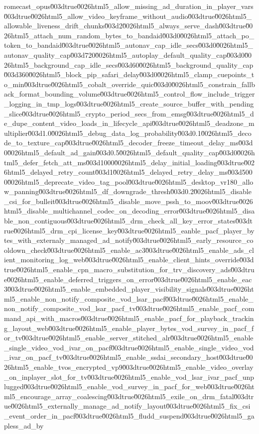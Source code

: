 {romecast_opus\u003dtrue\u0026html5_allow_missing_ad_duration_in_player_vars\u003dtrue\u0026html5_allow_video_keyframe_without_audio\u003dtrue\u0026html5_allowable_liveness_drift_chunks\u003d2\u0026html5_always_serve_dash\u003dtrue\u0026html5_attach_num_random_bytes_to_bandaid\u003d0\u0026html5_attach_po_token_to_bandaid\u003dtrue\u0026html5_autonav_cap_idle_secs\u003d0\u0026html5_autonav_quality_cap\u003d720\u0026html5_autoplay_default_quality_cap\u003d0\u0026html5_background_cap_idle_secs\u003d60\u0026html5_background_quality_cap\u003d360\u0026html5_block_pip_safari_delay\u003d0\u0026html5_clamp_cuepoints_to_min\u003dtrue\u0026html5_cobalt_override_quic\u003d0\u0026html5_constrain_fallback_format_bounding_volume\u003dtrue\u0026html5_control_flow_include_trigger_logging_in_tmp_logs\u003dtrue\u0026html5_create_source_buffer_with_pending_slice\u003dtrue\u0026html5_crypto_period_secs_from_emsg\u003dtrue\u0026html5_de_dupe_content_video_loads_in_lifecycle_api\u003dtrue\u0026html5_deadzone_multiplier\u003d1.0\u0026html5_debug_data_log_probability\u003d0.1\u0026html5_decode_to_texture_cap\u003dtrue\u0026html5_decoder_freeze_timeout_delay_ms\u003d0\u0026html5_default_ad_gain\u003d0.5\u0026html5_default_quality_cap\u003d0\u0026html5_defer_fetch_att_ms\u003d1000\u0026html5_delay_initial_loading\u003dtrue\u0026html5_delayed_retry_count\u003d1\u0026html5_delayed_retry_delay_ms\u003d5000\u0026html5_deprecate_video_tag_pool\u003dtrue\u0026html5_desktop_vr180_allow_panning\u003dtrue\u0026html5_df_downgrade_thresh\u003d0.2\u0026html5_disable_csi_for_bulleit\u003dtrue\u0026html5_disable_move_pssh_to_moov\u003dtrue\u0026html5_disable_multichannel_codec_on_decoding_error\u003dtrue\u0026html5_disable_non_contiguous\u003dtrue\u0026html5_drm_check_all_key_error_states\u003dtrue\u0026html5_drm_cpi_license_key\u003dtrue\u0026html5_eanble_pacf_player_bytes_with_externaly_managed_ad_notify\u003dtrue\u0026html5_early_resource_cooldown_check\u003dtrue\u0026html5_enable_ac3\u003dtrue\u0026html5_enable_ads_client_monitoring_log_web\u003dtrue\u0026html5_enable_client_hints_override\u003dtrue\u0026html5_enable_cpn_macro_substitution_for_trv_discovery_ads\u003dtrue\u0026html5_enable_deferred_triggers_on_error\u003dtrue\u0026html5_enable_eac3\u003dtrue\u0026html5_enable_embedded_player_visibility_signals\u003dtrue\u0026html5_enable_non_notify_composite_vod_lsar_pacf\u003dtrue\u0026html5_enable_non_notify_composite_vod_lsar_pacf_tv\u003dtrue\u0026html5_enable_pacf_command_api_with_macros\u003dtrue\u0026html5_enable_pacf_for_playback_tracking_layout_web\u003dtrue\u0026html5_enable_player_bytes_vod_survey_in_pacf_for_tv\u003dtrue\u0026html5_enable_server_stitched_alr\u003dtrue\u0026html5_enable_single_video_vod_ivar_on_pacf\u003dtrue\u0026html5_enable_single_video_vod_ivar_on_pacf_tv\u003dtrue\u0026html5_enable_ssdai_secondary_host\u003dtrue\u0026html5_enable_tvos_encrypted_vp9\u003dtrue\u0026html5_enable_video_overlay_on_inplayer_slot_for_tv\u003dtrue\u0026html5_enable_vod_lsar_ivar_pacf_unplugged\u003dtrue\u0026html5_enable_vod_survey_in_pacf_for_web\u003dtrue\u0026html5_encourage_array_coalescing\u003dtrue\u0026html5_exile_on_drm_fatal\u003dtrue\u0026html5_externally_manage_ad_notify_layout\u003dtrue\u0026html5_fix_csi_event_order_in_pacf\u003dtrue\u0026html5_fludd_suspend\u003dtrue\u0026html5_gapless_ad_by}
